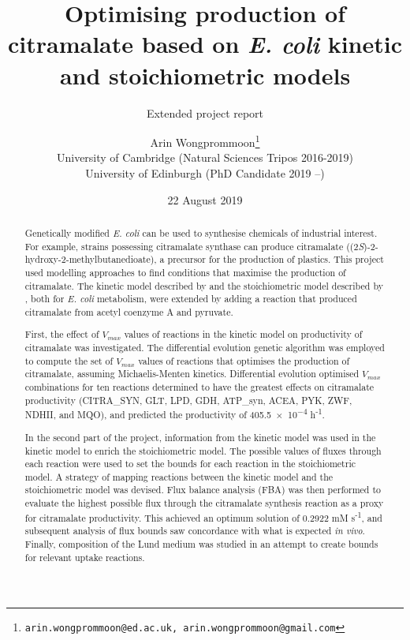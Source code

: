\documentclass[parskip=full, numbers=noenddot]{scrreprt}
\author{Arin Wongprommoon\thanks{\texttt{arin.wongprommoon@ed.ac.uk, arin.wongprommoon@gmail.com}}
  \\University of Cambridge (Natural Sciences Tripos 2016-2019)
\\University of Edinburgh (PhD Candidate 2019 --)}
\title{Optimising production of citramalate based on \emph{E. coli} kinetic and stoichiometric models}
\subtitle{Extended project report}
\date{22 August 2019}
\begin{document}
\maketitle

\tableofcontents

\begin{abstract}

    Genetically modified \emph{E. coli} can be used to synthesise chemicals of industrial interest. For example, strains possessing citramalate synthase can produce citramalate ((2\emph{S})-2-hydroxy-2-methylbutanedioate), a precursor for the production of plastics.
  This project used modelling approaches to find conditions that maximise the production of citramalate. The kinetic model described by \citet{millard_metabolic_2017} and the stoichiometric model described by \citet{orth_comprehensive_2011}, both for \emph{E. coli} metabolism, were extended by adding a reaction that produced citramalate from acetyl coenzyme A and pyruvate.
  
  First, the effect of $V_{max}$ values of reactions in the kinetic model on productivity of citramalate was investigated. The differential evolution genetic algorithm was employed to compute the set of $V_{max}$ values of reactions that optimises the production of citramalate, assuming Michaelis-Menten kinetics. Differential evolution optimised $V_{max}$ combinations for ten reactions determined to have the greatest effects on citramalate productivity (CITRA\_SYN, GLT, LPD, GDH, ATP\_syn, ACEA, PYK, ZWF, NDHII, and MQO), and predicted the productivity of \num{405.5e-4} h\textsuperscript{-1}.

  In the second part of the project, information from the kinetic model was used in the kinetic model to enrich the stoichiometric model. The possible values of fluxes through each reaction were used to set the bounds for each reaction in the stoichiometric model. A strategy of mapping reactions between the kinetic model and the stoichiometric model was devised. Flux balance analysis (FBA) was then performed to evaluate the highest possible flux through the citramalate synthesis reaction as a proxy for citramalate productivity. This achieved an optimum solution of 0.2922 mM s\textsuperscript{-1}, and subsequent analysis of flux bounds saw concordance with what is expected \emph{in vivo}. Finally, composition of the Lund medium \citep{eastham_process_2015} was studied in an attempt to create bounds for relevant uptake reactions.
  
\end{abstract}
\end{document}
